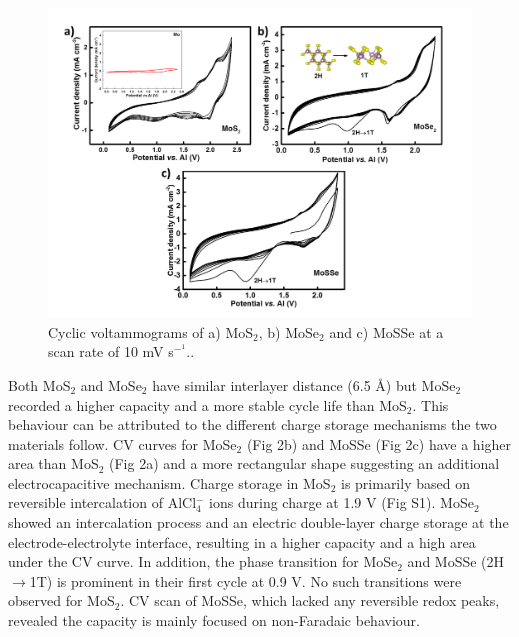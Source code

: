 \documentclass[num-refs]{wiley-article}
\begin{document}
\begin{figure}[h!]
\centering
\includegraphics[width=\textwidth]{figures/fig2}
\caption{Cyclic voltammograms of a) MoS$_2$, b) MoSe$_2$ and c) MoSSe at a scan rate of 10 mV s$^-^1$..}
\end{figure}

Both MoS$_2$ and MoSe$_2$ have similar interlayer distance (6.5 \AA) but MoSe$_2$ recorded a higher capacity and a more stable cycle life than MoS$_2$. This behaviour can be attributed to the different charge storage mechanisms the two materials follow. CV curves for MoSe$_2$ (Fig 2b) and MoSSe (Fig 2c) have a higher area than MoS$_2$ (Fig 2a) and a more rectangular shape suggesting an additional electrocapacitive mechanism. Charge storage in MoS$_2$ is primarily based on reversible intercalation of AlCl$_4^-$ ions during charge at 1.9 V (Fig S1). MoSe$_2$ showed an intercalation process and an electric double-layer charge storage at the electrode-electrolyte interface, resulting in a higher capacity and a high area under the CV curve. In addition, the phase transition for MoSe$_2$ and MoSSe (2H$\rightarrow$1T) is prominent in their first cycle at 0.9 V. No such transitions were observed for MoS$_2$. CV scan of MoSSe, which lacked any reversible redox peaks, revealed the capacity is mainly focused on non-Faradaic behaviour.
\end{document}
